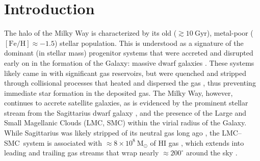 \documentclass[modern]{aastex62}
\newcommand{\todo}[1]{{\color{red} TODO: #1}}
\newcommand{\msun}{\textrm{M}_\odot}
\newcommand{\kpc}{\textrm{kpc}}
\newcommand{\feh}{\ensuremath{[\textrm{Fe} / \textrm{H}]}}
\newcommand{\clustername}{\textsl{NAME}}
\newcommand{\lmcsmc}{LMC--SMC}
\begin{document}
\begin{abstract}

We report the discovery of a young ($\lesssim 100~\textrm{Myr}$), metal-poor ($[\textrm{Fe}/\textrm{H}] \sim -1$) stellar association in the halo of the Milky Way ($(R, z) \sim (24, 16)~\textrm{kpc}$).
The association --- \clustername\ --- is likely associated with the leading arm of the gas stream emanating from the Magellanic cloud system, but is located $\approx 60^\circ$ from the Large Magellanic Cloud (LMC) center, on the other side of the Milky Way disk relative to the LMC.
By assuming that the cluster is co-located with HI gas in the stream, we directly measure the distance to the Magellanic stream, $d \approx 25~\textrm{kpc}$.
At this location relative to the LMC, the measured distance is inconsistent with predictions from models of the LMC/SMC interaction and infall into the Milky Way. \todo{that don't account for ram pressure and gas interaction with MW disk}
The estimated age of \clustername\ is consistent with the time of last passage through the Galactic midplane.
We therefore conclude that this star-formation event was triggered by the last disk passage, which occurred at a Galactocentric radius $R \approx XX~\kpc$.

\end{abstract}



\section{Introduction} \label{sec:intro}

The halo of the Milky Way is characterized by its old ($\gtrsim 10~\textrm{Gyr}$), metal-poor ($\feh \approx -1.5$) stellar population.
This is understood as a signature of the dominant (in stellar mass) progenitor systems that were accreted and disrupted early on in the formation of the Galaxy: massive dwarf galaxies \citep[e.g.,][]{Deason:2015, Fiorentino:2015}.
These systems likely came in with significant gas reservoirs, but were quenched and stripped through collisional processes that heated and dispersed the gas \citep[e.g.,][]{Mayer:2006}, thus preventing immediate star formation in the deposited gas.
The Milky Way, however, continues to accrete satellite galaxies, as is evidenced by the prominent stellar stream from the Sagittarius dwarf galaxy \citep{Ibata:1994, Majewski:2003}, and the presence of the Large and Small Magellanic Clouds (LMC, SMC) within the virial radius of the Galaxy.
While Sagittarius was likely stripped of its neutral gas long ago \citep{Burton:1999, Tepper-Garcia:2018}, the \lmcsmc\ system is associated with $\approx 8\times 10^8~\msun$ of HI gas \citep{Bruns:2005}, which extends into leading and trailing gas streams that wrap nearly $\approx 200^\circ$ around the sky \citep{Putman:1998, Bruns:2005, Nidever:2010}.
\end{document}
